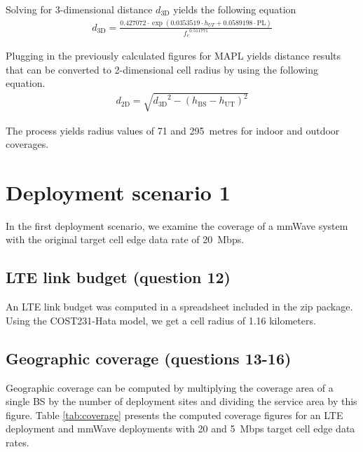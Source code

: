 \documentclass{article}
\begin{document}
Solving for 3-dimensional distance \(d_{\mathrm{3D}}\) yields the following equation
\begin{gather*}
    d_{\mathrm{3D}} = \frac{0.427072 \cdot \exp(0.0353519 \cdot h_{UT} + 0.0589198 \cdot \mathrm{PL})}{{f_c}^{0.511771}}
\end{gather*}

Plugging in the previously calculated figures for MAPL yields distance results that can be converted to 2-dimensional cell radius by using the following equation.
\begin{gather*}
    d_{\mathrm{2D}} = \sqrt{{d_{\mathrm{3D}}}^2 - (h_{\mathrm{BS}} - h_{\mathrm{UT}})^2}
\end{gather*}

The process yields radius values of 71 and 295\ metres for indoor and outdoor coverages.

\section{Deployment scenario 1}
In the first deployment scenario, we examine the coverage of a mmWave system with the original target cell edge data rate of 20\ Mbps. 
\subsection{LTE link budget (question 12)}
An LTE link budget was computed in a spreadsheet included in the zip package. Using the COST231-Hata model, we get a cell radius of 1.16 kilometers.

\subsection{Geographic coverage (questions 13-16)}
Geographic coverage can be computed by multiplying the coverage area of a single BS by the number of deployment sites and dividing the service area by this figure. Table \ref{tab:coverage} presents the computed coverage figures for an LTE deployment and mmWave deployments with 20 and 5\ Mbps target cell edge data rates.
\end{document}
